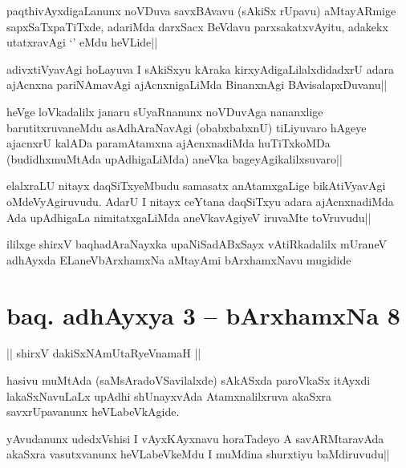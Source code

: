 \begin{artha}
paqthivAyxdigaLanunx noVDuva savxBAvavu (sAkiSx rUpavu) aMtayARmige sapxSaTxpaTiTxde, adariMda darxSacx BeVdavu parxsakatxvAyitu, adakekx utatxravAgi `\stext ' eMdu heVLide||
\end{artha}


\begin{artha}
adivxtiVyavAgi hoLayuva I sAkiSxyu kAraka kirxyAdigaLilalxdidadxrU adara ajAcnxna pariNAmavAgi ajAcnxnigaLiMda BinanxnAgi BAvisalapxDuvanu||
\end{artha}

\begin{artha}
heVge loVkadalilx janaru sUyaRnanunx noVDuvAga nananxlige barutitxruvaneMdu asAdhAraNavAgi (obabxbabxnU) tiLiyuvaro hAgeye ajacnxrU kalADa paramAtamxna ajAcnxnadiMda huTiTxkoMDa (budidhxmuMtAda upAdhigaLiMda) aneVka bageyAgikalilxsuvaro||
\end{artha}%


\begin{artha}
elalxraLU nitayx daqSiTxyeMbudu samasatx anAtamxgaLige bikAtiVyavAgi oMdeVyAgiruvudu. AdarU I nitayx ceYtana daqSiTxyu adara ajAcnxnadiMda Ada upAdhigaLa nimitatxgaLiMda aneVkavAgiyeV iruvaMte toVruvudu||
\end{artha}

\begin{center}
ililxge shirxV baqhadAraNayxka upaNiSadABxSayx vAtiRkadalilx mUraneV adhAyxda ELaneVbArxhamxNa aMtayAmi bArxhamxNavu mugidide
\end{center}

\section*{baq. adhAyxya 3 -- bArxhamxNa 8}

\begin{center}%
|| shirxV dakiSxNAmUtaRyeVnamaH ||
\end{center}

\begin{artha}
hasivu muMtAda (saMsAradoVSavilalxde) sAkASxda paroVkaSx itAyxdi lakaSxNavuLaLx upAdhi shUnayxvAda Atamxnalilxruva akaSxra savxrUpavanunx heVLabeVkAgide.
\end{artha}

\begin{artha}
yAvudanunx udedxVshisi I vAyxKAyxnavu horaTadeyo A savARMtaravAda akaSxra vasutxvanunx heVLabeVkeMdu I muMdina shurxtiyu baMdiruvudu||
\end{artha}

